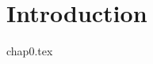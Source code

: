 \documentclass[a4paper,11pt]{book}
\begin{document}
 
\frontmatter

 
\thispagestyle{empty}
 
\tableofcontents
 
\mainmatter
\chapter{Introduction}
{chap0.tex}
\end{document}
